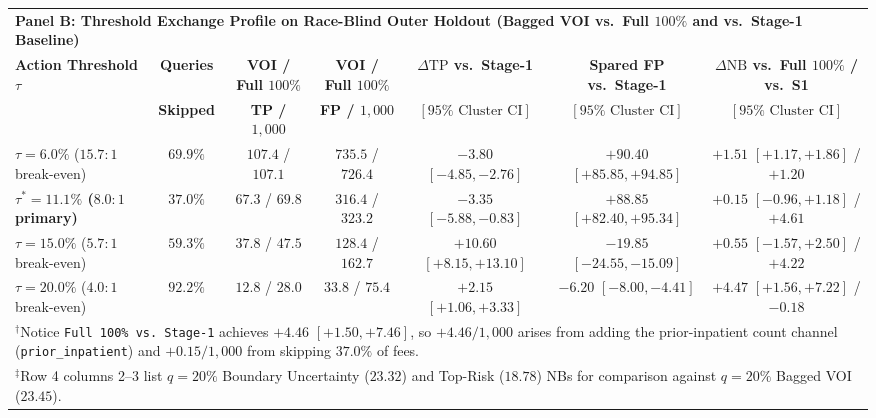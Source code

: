 \documentclass[11pt]{article}
\theoremstyle{remark}
\begin{document}
\begin{table}[t]
{\begin{tabular}{lcccccc}
\midrule
\multicolumn{7}{l}{\textbf{Panel B: Threshold Exchange Profile on Race-Blind Outer Holdout (Bagged VOI vs.\ Full $100\%$ and vs.\ Stage-1 Baseline)}} \\
\textbf{Action Threshold $\tau$} & \textbf{Queries} & \textbf{VOI / Full $100\%$} & \textbf{VOI / Full $100\%$} & \textbf{$\Delta\text{TP}$ vs.\ Stage-1} & \textbf{Spared FP vs.\ Stage-1} & \textbf{$\Delta\text{NB}$ vs.\ Full $100\%$ / vs.\ S1} \\
 & \textbf{Skipped} & \textbf{TP / $1{,}000$} & \textbf{FP / $1{,}000$} & $[95\%\text{ Cluster CI}]$ & $[95\%\text{ Cluster CI}]$ & $[95\%\text{ Cluster CI}]$ \\
\midrule
$\tau = 6.0\%$ ($15.7:1$ break-even) & $69.9\%$ & $107.4$ / $107.1$ & $735.5$ / $726.4$ & $-3.80$ $[-4.85, -2.76]$ & $+90.40$ $[+85.85, +94.85]$ & $\mathbf{+1.51}$ $[+1.17,+1.86]$ / $+1.20$ \\
\textbf{$\tau^* = 11.1\%$ ($8.0:1$ primary)} & $\mathbf{37.0\%}$ & $\mathbf{67.3}$ / $\mathbf{69.8}$ & $\mathbf{316.4}$ / $\mathbf{323.2}$ & $-3.35$ $[-5.88, -0.83]$ & $+88.85$ $[+82.40, +95.34]$ & $\mathbf{+0.15}$ $[-0.96,+1.18]$ / $+4.61$ \\
$\tau = 15.0\%$ ($5.7:1$ break-even) & $59.3\%$ & $37.8$ / $47.5$ & $128.4$ / $162.7$ & $+10.60$ $[+8.15, +13.10]$ & $-19.85$ $[-24.55, -15.09]$ & $+0.55$ $[-1.57,+2.50]$ / $+4.22$ \\
$\tau = 20.0\%$ ($4.0:1$ break-even) & $92.2\%$ & $12.8$ / $28.0$ & $33.8$ / $75.4$ & $+2.15$ $[+1.06, +3.33]$ & $-6.20$ $[-8.00, -4.41]$ & $\mathbf{+4.47}$ $[+1.56,+7.22]$ / $-0.18$ \\
\bottomrule
\multicolumn{7}{l}{$^\dagger$Notice \texttt{Full 100\% vs.\ Stage-1} achieves $+4.46$ $[+1.50, +7.46]$, so $+4.46/1{,}000$ arises from adding the prior-inpatient count channel (\texttt{prior\_inpatient}) and $+0.15/1{,}000$ from skipping $37.0\%$ of fees.} \\
\multicolumn{7}{l}{$^\ddagger$Row 4 columns 2--3 list $q=20\%$ Boundary Uncertainty ($23.32$) and Top-Risk ($18.78$) NBs for comparison against $q=20\%$ Bagged VOI ($23.45$).}
\end{tabular}%
}
\end{table}
\end{document}
